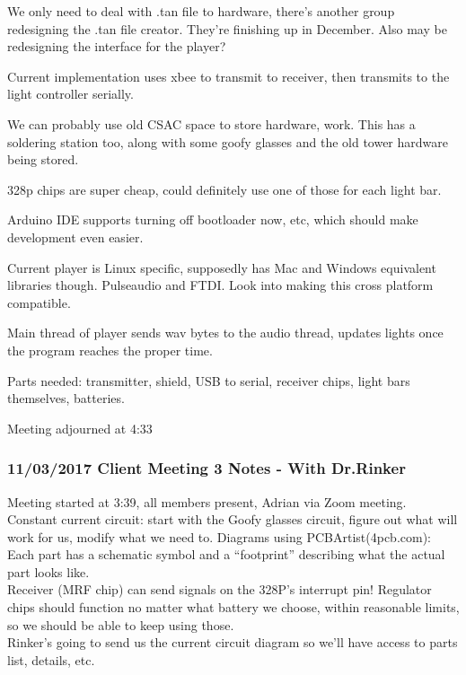 \documentclass[12pt]{article}
\begin{document}
We only need to deal with .tan file to hardware, there’s another group redesigning the .tan file creator. They’re finishing up in December. Also may be redesigning the interface for the player?

Current implementation uses xbee to transmit to receiver, then transmits to the light controller serially. 

We can probably use old CSAC space to store hardware, work. This has a soldering station too, along with some goofy glasses and the old tower hardware being stored. 

328p chips are super cheap, could definitely use one of those for each light bar. 

Arduino IDE supports turning off bootloader now, etc, which should make development even easier. 

Current player is Linux specific, supposedly has Mac and Windows equivalent libraries though. Pulseaudio and FTDI. Look into making this cross platform compatible.

Main thread of player sends wav bytes to the audio thread, updates lights once the program reaches the proper time. 

Parts needed: transmitter, shield, USB to serial, receiver chips, light bars themselves, batteries. 

Meeting adjourned at 4:33

	\clearpage
	\subsubsection{11/03/2017 Client Meeting 3 Notes - With Dr.Rinker}
	
	\noindent
	Meeting started at 3:39, all members present, Adrian via Zoom meeting.\\
	
	\noindent
	Constant current circuit: start with the Goofy glasses circuit, figure out what will work for us, 			modify what we need to. Diagrams using PCBArtist(4pcb.com): Each part has a schematic symbol and a 			“footprint” describing what the actual part looks like.\\

	\noindent
	Receiver (MRF chip) can send signals on the 328P’s interrupt pin! Regulator chips should function no 		matter what battery we choose, within reasonable limits, so we should be able to keep using those.\\ 
	
	\noindent	
	Rinker’s going to send us the current circuit diagram so we’ll have access to parts list, details, etc.\\ 
	
\end{document}
